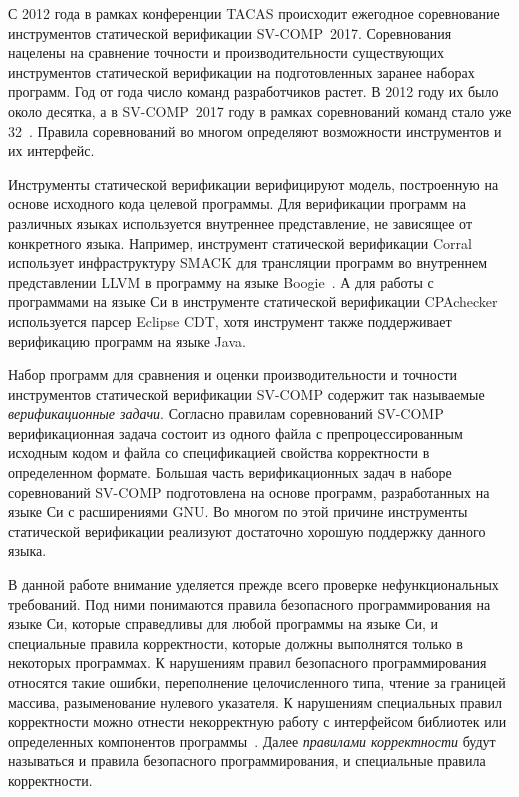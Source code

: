 \documentclass[%
candidate,     %
href,        %
colorlinks,  %
]{disser}
\begin{document}
С 2012 года в рамках конференции TACAS происходит ежегодное соревнование инструментов статической верификации \mbox{SV-COMP 2017}.
Соревнования нацелены на сравнение точности и производительности существующих инструментов статической верификации на подготовленных заранее наборах программ.
Год от года число команд разработчиков растет.
В 2012 году их было около десятка, а в \mbox{SV-COMP 2017} году в рамках соревнований команд стало уже 32~\cite{Beyer:2017:SVV}.
Правила соревнований во многом определяют возможности инструментов и их интерфейс.

Инструменты статической верификации верифицируют модель, построенную на основе исходного кода целевой программы.
Для верификации программ на различных языках используется внутреннее представление, не зависящее от конкретного языка.
Например, инструмент статической верификации \mbox{Corral} использует инфраструктуру \mbox{SMACK} для трансляции программ во внутреннем представлении \mbox{LLVM} в программу на языке \mbox{Boogie}~\cite{tacas2015-hcelqr}.
А для работы с программами на языке Си в инструменте статической верификации \mbox{CPAchecker}~\cite{Beyer:2011:CTC} используется парсер Eclipse CDT, хотя инструмент также поддерживает верификацию программ на языке \mbox{Java}.

Набор программ для сравнения и оценки производительности и точности инструментов статической верификации \mbox{SV-COMP} содержит так называемые \textit{верификационные задачи}.
Согласно правилам соревнований \mbox{SV-COMP} верификационная задача состоит из одного файла с препроцессированным  исходным кодом и файла со спецификацией свойства корректности в определенном формате.
Большая часть верификационных задач в наборе соревнований \mbox{SV-COMP} подготовлена на основе программ, разработанных на языке Си с расширениями GNU.
Во многом по этой причине инструменты статической верификации реализуют достаточно хорошую поддержку данного языка.

В данной работе внимание уделяется прежде всего проверке нефункциональных требований.
Под ними понимаются правила безопасного программирования на языке Си, которые справедливы для любой программы на языке Си, и специальные правила корректности, которые должны выполнятся только в некоторых программах.
К нарушениям правил безопасного программирования относятся такие ошибки, переполнение целочисленного типа, чтение за границей массива, разыменование нулевого указателя.
К нарушениям специальных правил корректности можно отнести некорректную работу с интерфейсом библиотек или определенных компонентов программы~\cite{commit_analysis_12enscopus}.
Далее \textit{правилами корректности} будут называться и правила безопасного программирования, и специальные правила корректности.
\end{document}
